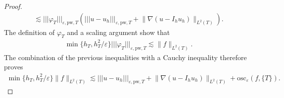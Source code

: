 \documentclass[a4paper]{amsart}
\theoremstyle{definition}
\numberwithin{equation}{section}
\numberwithin{theorem}{section}
\newcommand{\pw}{\mathrm{pw}}
\newcommand{\osc}{\mathrm{osc}}
\newcommand{\ennorm}[1]{\lvert\!\lvert\!\lvert #1 \rvert\!\rvert\!\rvert}
\begin{document}
\begin{proof}
\begin{align*}
        \lesssim 
             \ennorm{\varphi_T}_{\varepsilon,\pw,T}
             \left(\ennorm{u-u_h}_{\varepsilon,\pw,T}
            +\lVert \nabla (u-I_h u_h)\rVert_{L^2(T)}\right).
    \end{align*}
    The definition of $\varphi_T$ and a scaling argument show that 
    \begin{align*}
        \min\{h_T,h_T^2/\varepsilon\}
         \ennorm{\varphi_T}_{\varepsilon,\pw,T}
        \lesssim \lVert f\rVert_{L^2(T)}.
    \end{align*}
    The combination of the previous inequalities with 
    a Cauchy inequality therefore proves 
    \begin{align*}
        \min\{h_T,h_T^2/\varepsilon\} \lVert f\rVert_{L^2(T)}
        \lesssim \ennorm{u-u_h}_{\varepsilon,\pw,T}
            +\lVert \nabla (u-I_h u_h)\rVert_{L^2(T)}
            +\osc_\varepsilon(f,\{T\}).
    \end{align*}
    

\end{proof}
\end{document}
